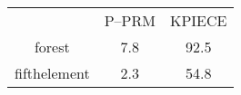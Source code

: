 \documentclass{article}
\begin{document}
\begin{tabular}{c c c}
&P--PRM&KPIECE\\
forest&7.8&92.5\\
fifthelement&2.3&54.8\\
\end{tabular}
\end{document}
